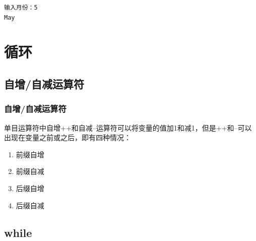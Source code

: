 \begin{tcolorbox}
	\begin{verbatim}
输入月份：5
May
	\end{verbatim}
\end{tcolorbox}

\newpage

\chapter{循环}

\section{自增/自减运算符}

\subsection{自增/自减运算符}

单目运算符中自增++和自减--运算符可以将变量的值加1和减1，但是++和--可以出现在变量之前或之后，即有四种情况：

\begin{enumerate}
	\item 前缀自增
	\item 前缀自减
	\item 后缀自增
	\item 后缀自减
\end{enumerate}

\begin{table}[H]
	\centering
	\caption{自增/自减运算符}
\end{table}

\newpage

\section{while}

